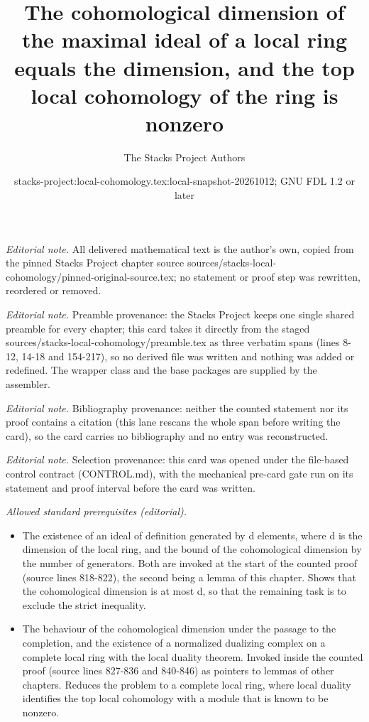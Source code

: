 \documentclass[10pt,a4paper]{amsart}
\title{The cohomological dimension of the maximal ideal of a local ring equals the dimension, and the top local cohomology of the ring is nonzero}
\author{The Stacks Project Authors}
\date{stacks-project:local-cohomology.tex:local-snapshot-20261012; GNU FDL 1.2 or later}
\theoremstyle{plain}
\theoremstyle{definition}
\theoremstyle{remark}
\numberwithin{equation}{subsection}
\begin{document}
\maketitle
\noindent\textit{Editorial note.} All delivered mathematical text is the author's own, copied from the pinned Stacks Project chapter source sources/stacks-local-cohomology/pinned-original-source.tex; no statement or proof step was rewritten, reordered or removed.\par\medskip
\noindent\textit{Editorial note.} Preamble provenance: the Stacks Project keeps one single shared preamble for every chapter; this card takes it directly from the staged sources/stacks-local-cohomology/preamble.tex as three verbatim spans (lines 8-12, 14-18 and 154-217), so no derived file was written and nothing was added or redefined. The wrapper class and the base packages are supplied by the assembler.\par\medskip
\noindent\textit{Editorial note.} Bibliography provenance: neither the counted statement nor its proof contains a citation (this lane rescans the whole span before writing the card), so the card carries no bibliography and no entry was reconstructed.\par\medskip
\noindent\textit{Editorial note.} Selection provenance: this card was opened under the file-based control contract (CONTROL.md), with the mechanical pre-card gate run on its statement and proof interval before the card was written.\par\medskip
\noindent\textit{Allowed standard prerequisites (editorial).}\begin{itemize}
\item The existence of an ideal of definition generated by d elements, where d is the dimension of the local ring, and the bound of the cohomological dimension by the number of generators. Both are invoked at the start of the counted proof (source lines 818-822), the second being a lemma of this chapter. Shows that the cohomological dimension is at most d, so that the remaining task is to exclude the strict inequality.
\item The behaviour of the cohomological dimension under the passage to the completion, and the existence of a normalized dualizing complex on a complete local ring with the local duality theorem. Invoked inside the counted proof (source lines 827-836 and 840-846) as pointers to lemmas of other chapters. Reduces the problem to a complete local ring, where local duality identifies the top local cohomology with a module that is known to be nonzero.
\end{itemize}\medskip
\end{document}
